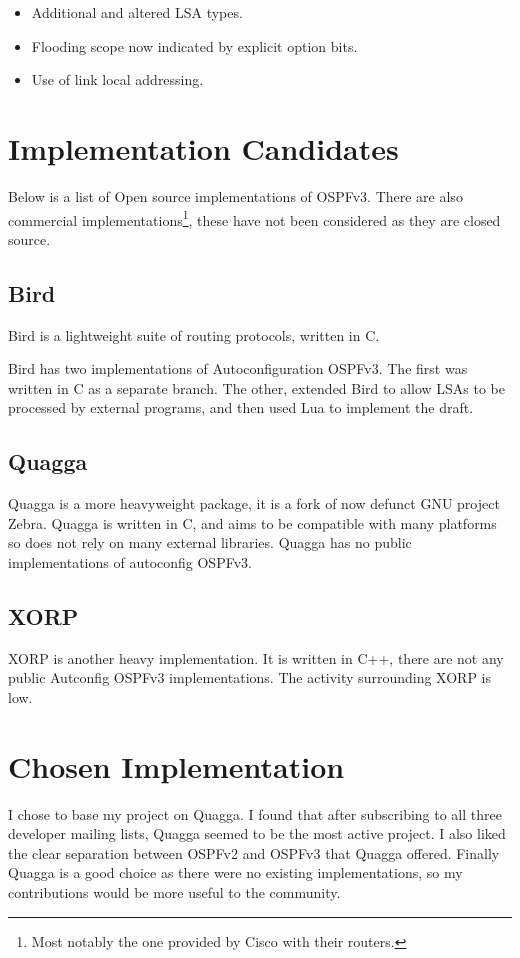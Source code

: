 \documentclass[12pt,a4paper,twoside]{report}
\begin{document}
\begin{itemize}
	\item Additional and altered LSA types.
	\item Flooding scope now indicated by explicit option bits.
	\item Use of link local addressing.
\end{itemize}

\section{Implementation Candidates}
Below is a list of Open source implementations of OSPFv3\@. There are also
commercial implementations\footnote{Most notably the one provided by Cisco with
their routers.}, these have not been considered as they are closed source. 

\subsection{Bird}
Bird\cite{BirdHome} is a lightweight suite of routing protocols, written
in C. 

Bird has two implementations of Autoconfiguration OSPFv3. The first was written
in C as a separate branch. The other, extended Bird to allow LSAs to be
processed by external programs, and then used Lua to implement the draft.

\subsection{Quagga}
Quagga\cite{QuaggaHome} is a more heavyweight package, it is a fork of now
defunct GNU project Zebra. Quagga is written in C, and aims to be
compatible with many platforms so does not rely on many external libraries.
Quagga has no public implementations of autoconfig OSPFv3.

\subsection{XORP}
XORP\cite{XORPHome} is another heavy implementation. It is written in C++,
there are not any public Autconfig OSPFv3 implementations. The activity
surrounding XORP is low. 

\section{Chosen Implementation}
I chose to base my project on Quagga. I found that after subscribing to all
three developer mailing lists, Quagga seemed to be the most active project.  I
also liked the clear separation between OSPFv2 and OSPFv3 that Quagga offered.
Finally Quagga is a good choice as there were no existing implementations, so
my contributions would be more useful to the community.
\end{document}
